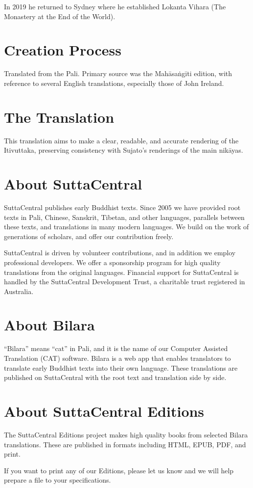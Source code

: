 \documentclass[12pt,openany]{book}%
\begin{document}
In 2019 he returned to Sydney where he established Lokanta Vihara (The Monastery at the End of the World). 

\section*{Creation Process}

Translated from the Pali. Primary source was the \textsanskrit{Mahāsaṅgīti} edition, with reference to several English translations, especially those of John Ireland.

\section*{The Translation}

This translation aims to make a clear, readable, and accurate rendering of the Itivuttaka, preserving consistency with Sujato’s renderings of the main \textsanskrit{nikāyas}. 

\section*{About SuttaCentral}

SuttaCentral publishes early Buddhist texts. Since 2005 we have provided root texts in Pali, Chinese, Sanskrit, Tibetan, and other languages, parallels between these texts, and translations in many modern languages. We build on the work of generations of scholars, and offer our contribution freely.

SuttaCentral is driven by volunteer contributions, and in addition we employ professional developers. We offer a sponsorship program for high quality translations from the original languages. Financial support for SuttaCentral is handled by the SuttaCentral Development Trust, a charitable trust registered in Australia.

\section*{About Bilara}

“Bilara” means “cat” in Pali, and it is the name of our Computer Assisted Translation (CAT) software. Bilara is a web app that enables translators to translate early Buddhist texts into their own language. These translations are published on SuttaCentral with the root text and translation side by side.

\section*{About SuttaCentral Editions}

The SuttaCentral Editions project makes high quality books from selected Bilara translations. These are published in formats including HTML, EPUB, PDF, and print.

If you want to print any of our Editions, please let us know and we will help prepare a file to your specifications.

%
\end{document}
